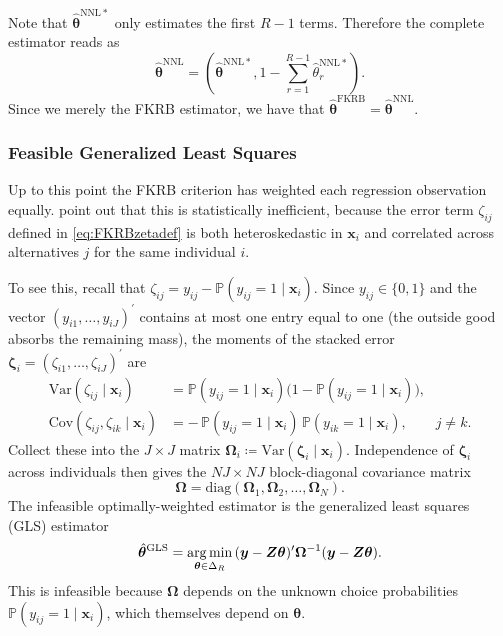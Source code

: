 Note that $\hat{\bm{\theta}}^{\mathrm{NNL*}}$ only estimates the first $R-1$ terms. Therefore the complete estimator reads as
\begin{equation}
\label{FKRBNLSest}
    \hat{\bm{\theta}}^{\mathrm{NNL}} = \left(\hat{\bm{\theta}}^{\mathrm{NNL*}}, 1 - \sum_{r=1}^{R-1}\hat{\theta}^{\mathrm{NNL*}}_r\right).
\end{equation}
Since we merely the FKRB estimator, we have that $\hat{\bm{\theta}}^{\mathrm{FKRB}} = \hat{\bm{\theta}}^{\mathrm{NNL}}$.
\subsubsection{Feasible Generalized Least Squares}
\label{sec:FKRBGLS}
Up to this point the FKRB criterion has weighted each regression observation equally.
\citet{FoxKimRyanBajari2011} point out that this is statistically inefficient, because the error term $\zeta_{ij}$ defined in \cref{eq:FKRBzetadef} is both heteroskedastic in $\bm{x}_i$ and correlated across alternatives $j$ for the same individual $i$.

To see this, recall that $\zeta_{ij} = y_{ij} - \mathbb{P}(y_{ij} = 1 \mid \bm{x}_i)$.
Since $y_{ij}\in\{0,1\}$ and the vector $(y_{i1},\ldots,y_{iJ})^\prime$ contains at most one entry equal to one (the outside good absorbs the remaining mass), the moments of the stacked error $\bm{\zeta}_i = (\zeta_{i1},\ldots,\zeta_{iJ})^\prime$ are
\begin{align}
\label{eq:FKRBzetavar}
    \mathrm{Var}(\zeta_{ij}\mid \bm{x}_i) &= \mathbb{P}(y_{ij} = 1\mid \bm{x}_i)\bigl(1 - \mathbb{P}(y_{ij} = 1\mid \bm{x}_i)\bigr), \\
\label{eq:FKRBzetacov}
    \mathrm{Cov}(\zeta_{ij},\zeta_{ik}\mid \bm{x}_i) &= -\,\mathbb{P}(y_{ij} = 1\mid \bm{x}_i)\,\mathbb{P}(y_{ik} = 1\mid \bm{x}_i),\qquad j\neq k.
\end{align}
Collect these into the $J\times J$ matrix $\bm{\Omega}_i \coloneq \mathrm{Var}(\bm{\zeta}_i\mid \bm{x}_i)$.
Independence of $\bm{\zeta}_i$ across individuals then gives the $NJ\times NJ$ block-diagonal covariance matrix
\begin{equation}
\label{eq:FKRBOmega}
    \bm{\Omega} = \mathrm{diag}(\bm{\Omega}_1, \bm{\Omega}_2, \ldots, \bm{\Omega}_N).
\end{equation}
The infeasible optimally-weighted estimator is the generalized least squares (GLS) estimator
\begin{equation}
\label{eq:FKRBGLSest}
    \hat{\bm{\theta}}^{\mathrm{GLS}} = \operatorname*{arg\,min}_{\bm{\theta} \in \Delta_R}\,(\bm{y} - \bm{Z}\bm{\theta})^\prime \bm{\Omega}^{-1}(\bm{y} - \bm{Z}\bm{\theta}).
\end{equation}
This is infeasible because $\bm{\Omega}$ depends on the unknown choice probabilities $\mathbb{P}(y_{ij} = 1 \mid \bm{x}_i)$, which themselves depend on $\bm{\theta}$.

